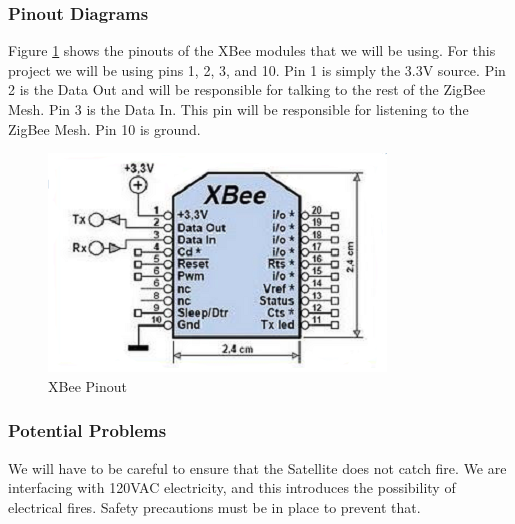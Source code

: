 \subsubsection{Pinout Diagrams}
Figure \ref{XBeePinout} shows the pinouts of the XBee modules that
we will be using. For this project we will be using pins 1, 2, 3, and 10.
Pin 1 is simply the 3.3V source. Pin 2 is the Data Out and will be 
responsible for talking to the rest of the ZigBee Mesh. Pin 3 is the 
Data In. This pin will be responsible for listening to the ZigBee Mesh.
Pin 10 is ground.

\begin{figure}[H]
\centering
\includegraphics[scale=1.0]{Hardware/images/XBeePinout.png}
\caption{XBee Pinout}
\label{XBeePinout}
\end{figure}

\subsubsection{Potential Problems}

We will have to be careful to ensure that the Satellite does 
not catch fire. We are interfacing with 120VAC electricity, and 
this introduces the possibility of electrical fires. 
Safety precautions must be in place to prevent that. 